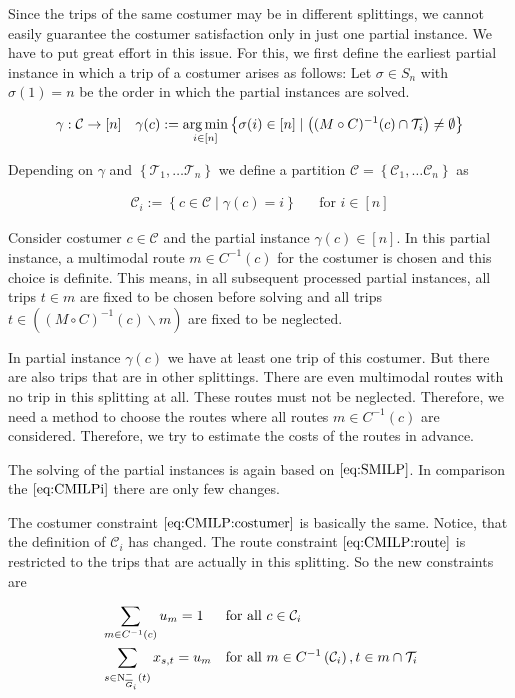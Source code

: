 Since the trips of the same costumer may be in different splittings, we cannot easily guarantee the costumer satisfaction only in just one partial instance. We have to put great effort in this issue. For this, we first define the earliest partial instance in which a trip of a costumer arises as follows: Let $\sigma\in S_n$ with $\sigma(1)=n$ be the order in which the partial instances are solved.

\begin{align*}
	\gamma: \mathcal{C}\to[n] && \gamma(c):=\operatorname*{arg\,min}_{i\in[n]}\left\{\sigma(i)\in[n]\mid \left((M\circ C)^{-1}(c)\cap\mathcal{T}_i\right)\neq\emptyset\right\}
\end{align*}

Depending on $\gamma$ and $\left\{\mathcal{T}_1,\dots\mathcal{T}_n\right\}$ we define a partition $\mathcal{C}=\left\{\mathcal{C}_1,\dots\mathcal{C}_n\right\}$ as

\begin{align*}
	\mathcal{C}_i := \left\{c\in\mathcal{C}\mid \gamma(c)=i\right\} && \text{for } i\in[n]
\end{align*}

Consider costumer $c\in\mathcal{C}$ and the partial instance $\gamma(c)\in[n]$. In this partial instance, a multimodal route $m\in C^{-1}(c)$ for the costumer is chosen and this choice is definite. This means, in all subsequent processed partial instances, all trips $t\in m$ are fixed to be chosen before solving and all trips $t\in\left((M\circ C)^{-1}(c)\backslash m\right)$ are fixed to be neglected.

In partial instance $\gamma(c)$ we have at least one trip of this costumer. But there are also trips that are in other splittings. There are even multimodal routes with no trip in this splitting at all. These routes must not be neglected. Therefore, we need a method to choose the routes where all routes $m\in C^{-1}(c)$ are considered. Therefore, we try to estimate the costs of the routes in advance.

The solving of the partial instances is again based on $\eqref{eq:SMILP}$. In comparison the $\eqref{eq:CMILPi}$ there are only few changes. 

The costumer constraint $\eqref{eq:CMILP:costumer}$ is basically the same. Notice, that the definition of $\mathcal{C}_i$ has changed. The route constraint $\eqref{eq:CMILP:route}$ is restricted to the trips that are actually in this splitting. So the new constraints are

\begin{align}
	&\sum_{m\in C^{-1}(c)} u_m = 1 && \text{for all } c\in\mathcal{C}_i \label{eq:TMILP:costumer} \\
	&\sum_{s\in\operatorname{N}_{\overline{G}_i}^-(t)} x_{s,t} = u_m && \text{for all } m\in C^{-1}\left(\mathcal{C}_i\right), t\in m\cap\mathcal{T}_i \label{eq:TMILP:route}
\end{align}


